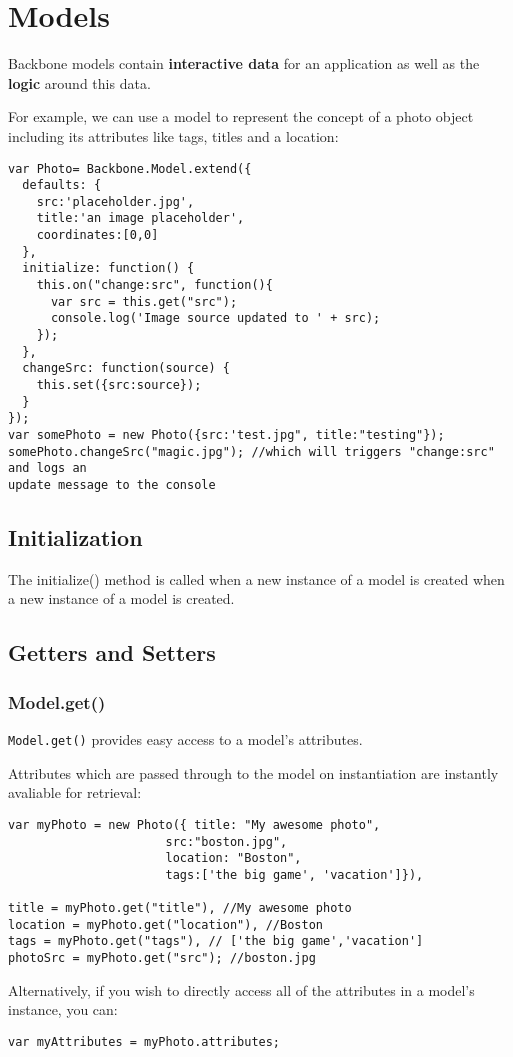 \documentclass[a4paper, 11pt]{book}
\begin{document}
\section{Models}
Backbone models contain \textbf{interactive data} for an application as well as
the \textbf{logic} around this data. 

For example, we can use a model to represent the concept of a photo object
including its attributes like tags, titles and a location:

\begin{verbatim}
var Photo= Backbone.Model.extend({
  defaults: {
    src:'placeholder.jpg',
    title:'an image placeholder',
    coordinates:[0,0]
  },
  initialize: function() {
    this.on("change:src", function(){
      var src = this.get("src");
      console.log('Image source updated to ' + src);
    });
  },
  changeSrc: function(source) {
    this.set({src:source});
  }
});
var somePhoto = new Photo({src:'test.jpg", title:"testing"});
somePhoto.changeSrc("magic.jpg"); //which will triggers "change:src" and logs an
update message to the console
\end{verbatim}
\subsection{Initialization}
The initialize() method is called when a new instance of a model is created
when a new instance of a model is created. 
\subsection{Getters and Setters}
\subsubsection{Model.get()}
\verb|Model.get()| provides easy access to a model's attributes.

Attributes which are passed through to the model on instantiation are instantly
avaliable for retrieval:
\begin{verbatim}
var myPhoto = new Photo({ title: "My awesome photo", 
                      src:"boston.jpg", 
                      location: "Boston", 
                      tags:['the big game', 'vacation']}),

title = myPhoto.get("title"), //My awesome photo
location = myPhoto.get("location"), //Boston
tags = myPhoto.get("tags"), // ['the big game','vacation']
photoSrc = myPhoto.get("src"); //boston.jpg
\end{verbatim}
Alternatively, if you wish to directly access all of the attributes in a model's
instance, you can:
\begin{verbatim}
var myAttributes = myPhoto.attributes;
\end{verbatim}
\end{document}
